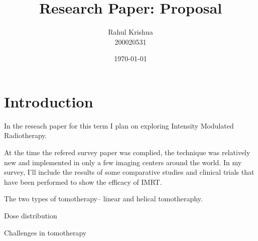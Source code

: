 \documentclass{article}
\title{Research Paper: Proposal}
\author{Rahul Krishna \\ 200020531}
\date{\today}
\begin{document}
	\maketitle
	\section{Introduction}
	\begin{list}{--}
	\item In the reseach paper for this term I plan on exploring Intensity Modulated Radiotherapy. 
	\item At the time the refered survey paper was complied, the technique was relatively new and implemented in only a few imaging centers around the world. In my survey, I'll include the results of some comparative studies and clinical trials that have been performed to show the efficacy of IMRT.
	\item The two types of tomotherapy-- linear and helical tomotheraphy. 
	\item Dose distribution
	\item Challenges in tomotherapy 
	\end{list}
\end{document}
